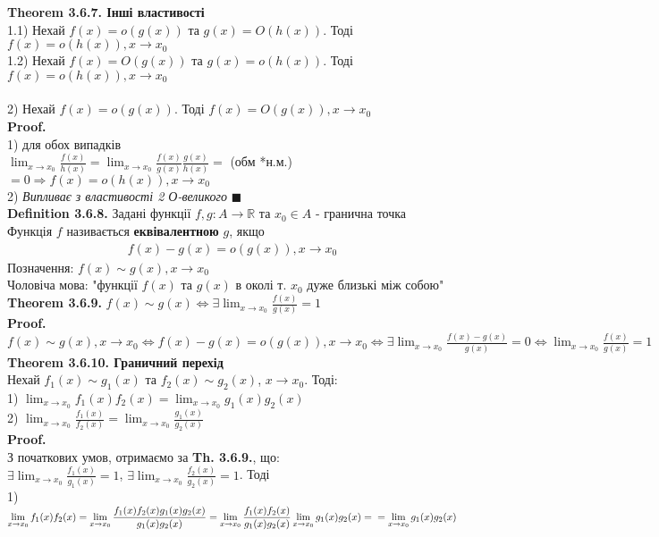 \documentclass[a4paper, 14pt]{extarticle}
\def\huge{\displaystyle}
\def\bigline{\vspace{5mm}\\}
\def\defin#1{\textbf{Definition {#1}}}
\def\th#1{\textbf{Theorem {#1}}}
\def\proof{\textbf{Proof.}\\}
\def\bigline{\vspace{5mm}\\}
\def\qed{$\blacksquare$}
\begin{document}
\th{3.6.7. Інші властивості}\\
1.1) Нехай $f(x) = o(g(x))$ та $g(x) = O(h(x))$. Тоді $f(x) = o(h(x)), x \to x_0$\\
1.2) Нехай $f(x) = O(g(x))$ та $g(x) = o(h(x))$. Тоді $f(x) = o(h(x)), x \to x_0$\\
\\
2) Нехай $f(x) = o(g(x))$. Тоді $f(x) = O(g(x)), x \to x_0$\\
\proof
1) для обох випадків\\
$\huge \lim_{x \to x_0} \frac{f(x)}{h(x)} = \lim_{x \to x_0} \frac{f(x)}{g(x)} \frac{g(x)}{h(x)} =$ (обм *н.м.) $= 0 \Rightarrow f(x) = o(h(x)), x \to x_0$
\bigline
2) \textit{Випливає з властивості 2 О-великого} \qed
\bigline
\defin{3.6.8.} Задані функції $f,g: A \to \mathbb{R}$ та $x_0 \in A$ - гранична точка\\
Функція $f$ називається \textbf{еквівалентною} $g$, якщо
\begin{align*}
f(x) - g(x) = o(g(x)), x \to x_0
\end{align*}
Позначення: $f(x) \sim g(x), x \to x_0$\\
Чоловіча мова: "функції $f(x)$ та $g(x)$ в околі т. $x_0$ дуже близькі між собою"
\bigline
\th{3.6.9.} $f(x) \sim g(x) \iff \huge \exists \lim_{x \to x_0} \frac{f(x)}{g(x)} = 1$\\
\proof
$f(x) \sim g(x), x \to x_0 \iff f(x) - g(x) = o(g(x)), x \to x_0 \iff \huge \exists \lim_{x \to x_0} \frac{f(x)-g(x)}{g(x)} = 0 \iff \lim_{x \to x_0} \frac{f(x)}{g(x)} = 1$
\bigline
\th{3.6.10. Граничний перехід}\\
Нехай $f_1(x) \sim g_1(x)$ та $f_2(x) \sim g_2(x)$, $x \to x_0$. Тоді:\\
1) $\huge \lim_{x \to x_0} f_1(x) f_2(x) = \lim_{x \to x_0} g_1(x) g_2(x)$\\
2) $\huge \lim_{x \to x_0} \frac{f_1(x)}{f_2(x)} = \lim_{x \to x_0} \frac{g_1(x)}{g_2(x)}$\\
\proof
З початкових умов, отримаємо за \textbf{Th. 3.6.9.}, що:\\
$\huge \exists \lim_{x \to x_0} \frac{f_1(x)}{g_1(x)} = 1$, $\huge \exists \lim_{x \to x_0} \frac{f_2(x)}{g_2(x)} = 1$. Тоді\\
1) $\huge \lim_{x \to x_0} f_1(x) f_2(x) = \lim_{x \to x_0} \frac{f_1(x) f_2(x) g_1(x) g_2(x)}{g_1(x) g_2(x)} = \lim_{x \to x_0} \frac{f_1(x) f_2(x)}{g_1(x) g_2(x)} \lim_{x \to x_0} g_1(x) g_2(x) = \\ = \lim_{x \to x_0} g_1(x) g_2(x)$\\
\end{document}
